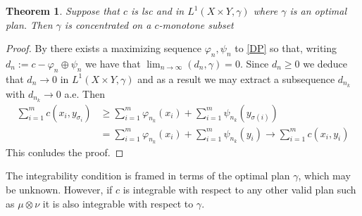 \documentclass[
    a4paper,
    DIV=14,
    abstract=true,
    numbers=noenddot
]
{scrartcl}
\newtheorem{theorem}{Theorem}[section]
\theoremstyle{definition}
\begin{document}
\begin{theorem}\label{prop: support}
    Suppose that $c$ is lsc and in $ L^1(X\times Y, \gamma )$  where $\gamma $ is an optimal plan. Then $\gamma $ is concentrated on a $c$-monotone subset
\end{theorem}
\begin{proof}
    By  there exists a maximizing sequence $\varphi _n, \psi _n $ to \eqref{DP} so that, writing $d_n:=c-\varphi_n\oplus \psi _n$ we have that $ \lim_{n \to \infty}(d_n, \gamma )=0$. Since $d_n \geq 0$  we deduce that $ d_n \to   0$ in $L^1(X\times Y, \gamma )$ and as a result we may extract a subsequence $d_{n_k}$ with $ d_{n_k} \to  0$ a.e. Then
    \begin{align*}
        \sum_{i=1}^m c(x_i, y_{\sigma_i}) & \geq   \sum_{i=1}^m \varphi_{n_k}(x_i)+ \sum_{i=1}^m \psi_{n_k} (y_{\sigma(i)})                \\
                                          & =\sum_{i=1}^m \varphi_{n_k}(x_i)+ \sum_{i=1}^m \psi_{n_k} (y_{i}) \to \sum_{i=1}^m c(x_i, y_i)
    \end{align*}
    This conludes the proof.
\end{proof}
The integrability condition is framed in terms of the optimal plan $\gamma $, which may be unknown. However, if $c$ is integrable with respect to any other valid plan such as $\mu \otimes \nu$ it is also integrable with respect to $\gamma $.
\end{document}
